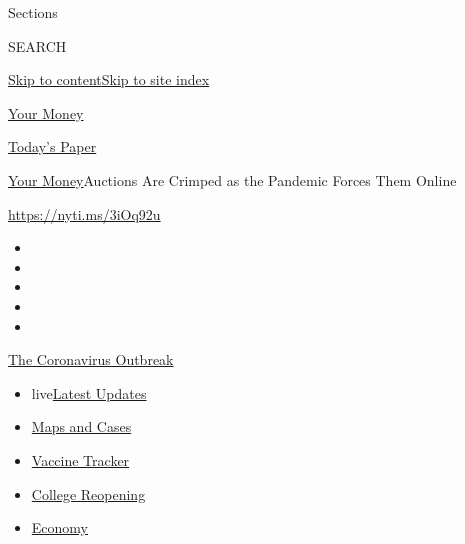 Sections

SEARCH

\protect\hyperlink{site-content}{Skip to
content}\protect\hyperlink{site-index}{Skip to site index}

\href{https://www.nytimes3xbfgragh.onion/section/your-money}{Your Money}

\href{https://myaccount.nytimes3xbfgragh.onion/auth/login?response_type=cookie\&client_id=vi}{}

\href{https://www.nytimes3xbfgragh.onion/section/todayspaper}{Today's
Paper}

\href{/section/your-money}{Your Money}\textbar{}Auctions Are Crimped as
the Pandemic Forces Them Online

\url{https://nyti.ms/3iOq92u}

\begin{itemize}
\item
\item
\item
\item
\item
\end{itemize}

\href{https://www.nytimes3xbfgragh.onion/news-event/coronavirus?action=click\&pgtype=Article\&state=default\&region=TOP_BANNER\&context=storylines_menu}{The
Coronavirus Outbreak}

\begin{itemize}
\tightlist
\item
  live\href{https://www.nytimes3xbfgragh.onion/2020/08/03/world/coronavirus-covid-19.html?action=click\&pgtype=Article\&state=default\&region=TOP_BANNER\&context=storylines_menu}{Latest
  Updates}
\item
  \href{https://www.nytimes3xbfgragh.onion/interactive/2020/us/coronavirus-us-cases.html?action=click\&pgtype=Article\&state=default\&region=TOP_BANNER\&context=storylines_menu}{Maps
  and Cases}
\item
  \href{https://www.nytimes3xbfgragh.onion/interactive/2020/science/coronavirus-vaccine-tracker.html?action=click\&pgtype=Article\&state=default\&region=TOP_BANNER\&context=storylines_menu}{Vaccine
  Tracker}
\item
  \href{https://www.nytimes3xbfgragh.onion/2020/08/02/us/covid-college-reopening.html?action=click\&pgtype=Article\&state=default\&region=TOP_BANNER\&context=storylines_menu}{College
  Reopening}
\item
  \href{https://www.nytimes3xbfgragh.onion/live/2020/08/03/business/stock-market-today-coronavirus?action=click\&pgtype=Article\&state=default\&region=TOP_BANNER\&context=storylines_menu}{Economy}
\end{itemize}

